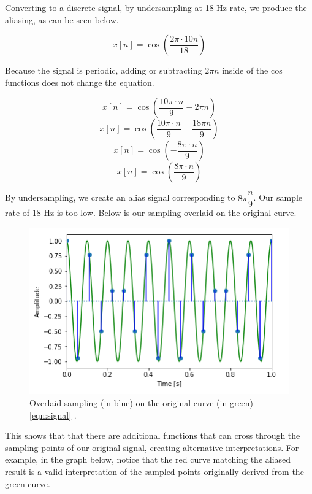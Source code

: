 Converting to a discrete signal, by undersampling at 18 Hz rate, we
produce the aliasing, as can be seen below.

\begin{equation}
	x[n]=\cos(\frac{2\pi \cdot 10n}{18})
\end{equation}

Because the signal is periodic, adding or subtracting $2\pi n$ 
inside of the cos functions does not change the equation.

\begin{equation}
	x[n]=\cos(\frac{10\pi \cdot n}{9} - 2\pi n)
\end{equation}
\begin{equation}
	x[n]=\cos(\frac{10\pi \cdot n}{9} - \frac{18\pi n}{9})
\end{equation}
\begin{equation}
	x[n]=\cos(-\frac{8\pi\cdot n}{9})
\end{equation}
\begin{equation}
	x[n]=\cos(\frac{8\pi\cdot n}{9})
\end{equation}

By undersampling, we create an alias signal corresponding to
\(8\pi\dfrac{n}{9}\). Our sample rate of 18 Hz is too low. Below
is our sampling overlaid on the original curve.

\begin{figure}[H]
	\centering
	\includegraphics[scale = 1]{images/sub_sample.png} %
	\caption{
		Overlaid sampling (in blue) on the original curve (in green) 
		\ref{eqn:signal} 
		\cite{notebook:sampling}.
	}
	\label{fig:sub_sample}
\end{figure}    

This shows that that there are additional functions that can cross
through the sampling points of our original signal, creating
alternative interpretations. For example, in the graph below,
notice that the red curve matching the aliased result is a valid
interpretation of the sampled points originally derived from the
green curve.

